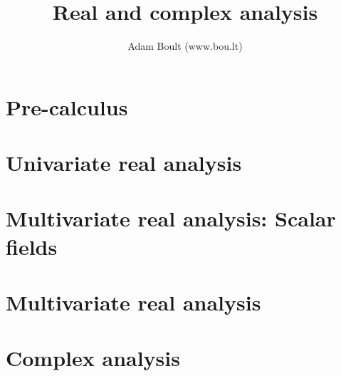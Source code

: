 \documentclass[oneside]{book}
\begin{document}
\author{Adam Boult (www.bou.lt)}
\title{Real and complex analysis}
\maketitle

\setcounter{tocdepth}{0}
\tableofcontents



\part{Pre-calculus}






\part{Univariate real analysis}












\part{Multivariate real analysis: Scalar fields}




\part{Multivariate real analysis}





\part{Complex analysis}




\end{document}
